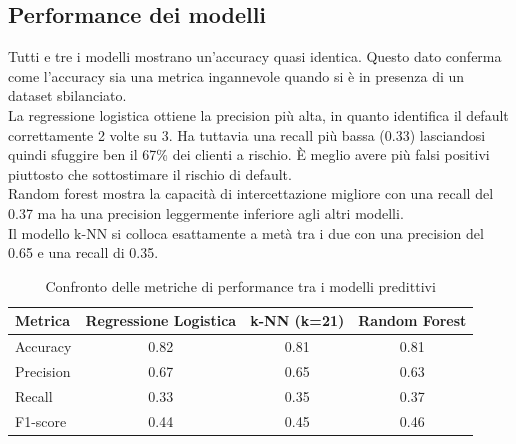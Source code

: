 \documentclass{article}
\begin{document}
\subsection{Performance dei modelli}
    Tutti e tre i modelli mostrano un'accuracy quasi identica. Questo dato conferma come l'accuracy sia una metrica ingannevole quando si \`e in presenza di un dataset sbilanciato.\\
    La regressione logistica ottiene la precision pi\`u alta, in quanto identifica il default correttamente 2 volte su 3. Ha tuttavia una recall pi\`u bassa (0.33) lasciandosi quindi sfuggire ben il 67\% dei clienti a rischio. \`E meglio avere pi\`u falsi positivi piuttosto che sottostimare il rischio di default.\\
    Random forest mostra la capacit\`a di intercettazione migliore con una recall del 0.37 ma ha una precision leggermente inferiore agli altri modelli.\\
    Il modello k-NN si colloca esattamente a met\`a tra i due con una precision del 0.65 e una recall di 0.35.\\
        \begin{table}[H]
        \centering
        \begin{tabular}{lccc}
        \toprule
        \textbf{Metrica} & \textbf{Regressione Logistica} & \textbf{k-NN (k=21)} & \textbf{Random Forest} \\
        \midrule
        Accuracy   & 0.82 & 0.81 & 0.81 \\
        Precision  & 0.67 & 0.65 & 0.63 \\
        Recall     & 0.33 & 0.35 & 0.37 \\
        F1-score   & 0.44 & 0.45 & 0.46 \\
        \bottomrule
        \end{tabular}
        \caption{Confronto delle metriche di performance tra i modelli predittivi}
        \label{tab:confronto_modelli}
        \end{table}
\end{document}
